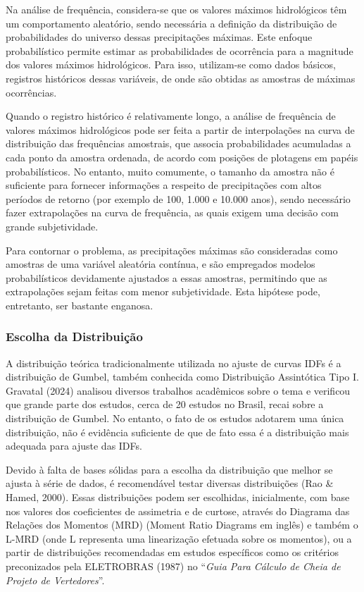 \documentclass[
]{agujournal2019}
\begin{document}
Na análise de frequência, considera-se que os valores máximos
hidrológicos têm um comportamento aleatório, sendo necessária a
definição da distribuição de probabilidades do universo dessas
precipitações máximas. Este enfoque probabilístico permite estimar as
probabilidades de ocorrência para a magnitude dos valores máximos
hidrológicos. Para isso, utilizam-se como dados básicos, registros
históricos dessas variáveis, de onde são obtidas as amostras de máximas
ocorrências.

Quando o registro histórico é relativamente longo, a análise de
frequência de valores máximos hidrológicos pode ser feita a partir de
interpolações na curva de distribuição das frequências amostrais, que
associa probabilidades acumuladas a cada ponto da amostra ordenada, de
acordo com posições de plotagens em papéis probabilísticos. No entanto,
muito comumente, o tamanho da amostra não é suficiente para fornecer
informações a respeito de precipitações com altos períodos de retorno
(por exemplo de 100, 1.000 e 10.000 anos), sendo necessário fazer
extrapolações na curva de frequência, as quais exigem uma decisão com
grande subjetividade.

Para contornar o problema, as precipitações máximas são consideradas
como amostras de uma variável aleatória contínua, e são empregados
modelos probabilísticos devidamente ajustados a essas amostras,
permitindo que as extrapolações sejam feitas com menor subjetividade.
Esta hipótese pode, entretanto, ser bastante enganosa.

\subsubsection{Escolha da
Distribuição}\label{escolha-da-distribuiuxe7uxe3o}

A distribuição teórica tradicionalmente utilizada no ajuste de curvas
IDFs é a distribuição de Gumbel, também conhecida como Distribuição
Assintótica Tipo I. Gravatal (2024) analisou diversos trabalhos
acadêmicos sobre o tema e verificou que grande parte dos estudos, cerca
de 20 estudos no Brasil, recai sobre a distribuição de Gumbel. No
entanto, o fato de os estudos adotarem uma única distribuição, não é
evidência suficiente de que de fato essa é a distribuição mais adequada
para ajuste das IDFs.

Devido à falta de bases sólidas para a escolha da distribuição que
melhor se ajusta à série de dados, é recomendável testar diversas
distribuições (Rao \& Hamed, 2000). Essas distribuições podem ser
escolhidas, inicialmente, com base nos valores dos coeficientes de
assimetria e de curtose, através do Diagrama das Relações dos Momentos
(MRD) (Moment Ratio Diagrams em inglês) e também o L-MRD (onde L
representa uma linearização efetuada sobre os momentos), ou a partir de
distribuições recomendadas em estudos específicos como os critérios
preconizados pela ELETROBRAS (1987) no ``\emph{Guia Para Cálculo de
Cheia de Projeto de Vertedores}''.
\end{document}
